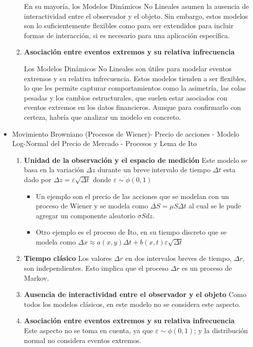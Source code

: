 \begin{problema}
\begin{sol}
\begin{itemize}
\begin{enumerate}
    En su mayoría, los Modelos Dinámicos No Lineales asumen la ausencia de interactividad entre el observador y el objeto. Sin embargo, estos modelos son lo suficientemente flexibles como para ser extendidos para incluir formas de interacción, si es necesario para una aplicación específica.
    
    \item \textbf{Asociación entre eventos extremos y su relativa infrecuencia}
    
    Los Modelos Dinámicos No Lineales son útiles para modelar eventos extremos y su relativa infrecuencia. Estos modelos tienden a ser flexibles, lo que les permite capturar comportamientos como la asimetría, las colas pesadas y los cambios estructurales, que suelen estar asociados con eventos extremos en los datos financieros. Aunque para confirmarlo con certeza, habría que analizar un modelo en concreto. 
    \end{enumerate}

\item Movimiento Browniano (Procesos de Wiener)- Precio de acciones - Modelo Log-Normal del Precio de Mercado - Procesos y Lema de Ito 
\begin{enumerate}
\item \textbf{Unidad de la observación y el espacio de medición}
Este modelo se basa en la variación $\Delta z$ durante un breve intervalo de tiempo $\Delta t$ esta dado por $\Delta z= \varepsilon \sqrt{\Delta t}$ donde $\varepsilon\sim \phi (0,1)$
\begin{itemize}
    \item Un ejemplo son el precio de las acciones que se modelan con un proceso de Wiener y se modela como $\Delta S= \mu S\Delta t$ al cual se le pude agregar un componente aleatorio $\sigma S dz$. 
    \item Otro ejemplo es el proceso de Ito, en su tiempo discreto que se modela como $\Delta x\approx a(x,y)\Delta t +b(x,t)\varepsilon \sqrt{\Delta t}$
\end{itemize}
\item \textbf{Tiempo clásico}
Los valores $\Delta r$ en dos intervalos breves de tiempo, $\Delta r$, son independientes. Esto implica que el proceso $\Delta r$ es un proceso de Markov.
\item \textbf{Ausencia de interactividad entre el observador y el objeto}
Como todos los modelos clásicos, en este modelo no se considera este aspecto. 
\item \textbf{Asociación entre eventos extremos y su relativa infrecuencia}
Este aspecto no se toma en cuenta, ya que $\varepsilon\sim \phi (0,1)$; y la distribución normal no considera eventos extremos. 
\end{enumerate}


\end{itemize}
\end{sol}
\end{problema}
